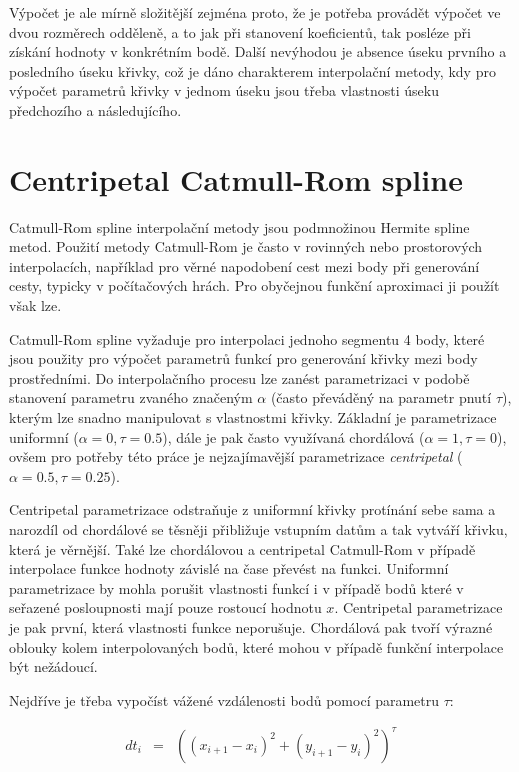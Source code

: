\documentclass[]{thesiskiv}
\begin{document}
Výpočet je ale mírně složitější zejména proto, že je potřeba provádět výpočet ve dvou rozměrech odděleně, a to jak při stanovení koeficientů, tak posléze při získání hodnoty v konkrétním bodě. Další nevýhodou je absence úseku prvního a posledního úseku křivky, což je dáno charakterem interpolační metody, kdy pro výpočet parametrů křivky v jednom úseku jsou třeba vlastnosti úseku předchozího a následujícího.

\section{Centripetal Catmull-Rom spline}

Catmull-Rom spline interpolační metody jsou podmnožinou Hermite spline metod\cite{catmull}. Použití metody Catmull-Rom je často v rovinných nebo prostorových interpolacích, například pro věrné napodobení cest mezi body při generování cesty, typicky v počítačových hrách. Pro obyčejnou funkční aproximaci ji použít však lze.

Catmull-Rom spline vyžaduje pro interpolaci jednoho segmentu 4 body, které jsou použity pro výpočet parametrů funkcí pro generování křivky mezi body prostředními. Do interpolačního procesu lze zanést parametrizaci v podobě stanovení parametru zvaného  značeným $\alpha$ (často převáděný na parametr pnutí $\tau$), kterým lze snadno manipulovat s vlastnostmi křivky. Základní je parametrizace uniformní ($\alpha = 0, \tau = 0.5$), dále je pak často využívaná chordálová ($\alpha = 1, \tau = 0$), ovšem pro potřeby této práce je nejzajímavější parametrizace \emph{centripetal} ($\alpha = 0.5, \tau = 0.25$).

Centripetal parametrizace odstraňuje z uniformní křivky protínání sebe sama a narozdíl od chordálové se těsněji přibližuje vstupním datům a tak vytváří křivku, která je věrnější. Také lze chordálovou a centripetal Catmull-Rom v případě interpolace funkce hodnoty závislé na čase převést na funkci. Uniformní parametrizace by mohla porušit vlastnosti funkcí i v případě bodů které v seřazené posloupnosti mají pouze rostoucí hodnotu $x$. Centripetal parametrizace je pak první, která vlastnosti funkce neporušuje. Chordálová pak tvoří výrazné oblouky kolem interpolovaných bodů, které mohou v případě funkční interpolace být nežádoucí.

Nejdříve je třeba vypočíst vážené vzdálenosti bodů pomocí parametru $\tau$:

\begin{equation}
\begin{array}{rcl}
 dt_{i} & = & ((x_{i+1} - x_i)^2 + (y_{i+1} - y_i)^2)^\tau \\
\end{array}
\end{equation}
\end{document}

